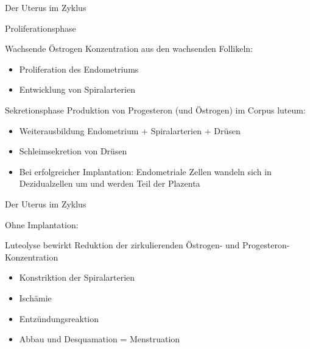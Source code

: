 \documentclass{beamer}
\begin{document}
\begin{frame}{Der  Uterus  im Zyklus}

\begin{block}{Proliferationsphase}


    Wachsende Östrogen Konzentration aus den wachsenden Follikeln:

\begin{itemize}
\item
Proliferation des Endometriums
\item
Entwicklung von Spiralarterien
\end{itemize}

\end{block}

\pause

\begin{block}{Sekretionsphase}
Produktion von Progesteron (und Östrogen) im Corpus luteum:
\begin{itemize}
\item
Weiterausbildung Endometrium + Spiralarterien + Drüsen
\item
Schleimsekretion von Drüsen
\item
Bei erfolgreicher Implantation: Endometriale Zellen wandeln sich in Dezidualzellen um und werden Teil der Plazenta
\end{itemize}

\end{block}
\end{frame}

\begin{frame}{Der  Uterus  im Zyklus}


\begin{block}{Ohne Implantation:}

Luteolyse bewirkt Reduktion der zirkulierenden Östrogen- und Progesteron-Konzentration

\begin{itemize}
\item
Konstriktion der Spiralarterien 
\item
Ischämie 
\item 
Entzündungsreaktion 
\item
Abbau und Desquamation = Menstruation
\end{itemize}

\end{block}


\end{frame}




\end{document}
